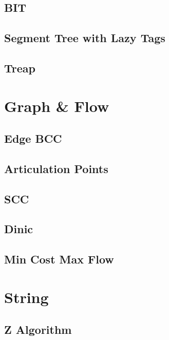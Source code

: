 \subsection{BIT}

\subsection{Segment Tree with Lazy Tags}

\subsection{Treap}


\section{Graph \& Flow}
\subsection{Edge BCC}

\subsection{Articulation Points}

\subsection{SCC}

\subsection{Dinic}

\subsection{Min Cost Max Flow}


\section{String}
\subsection{Z Algorithm}

